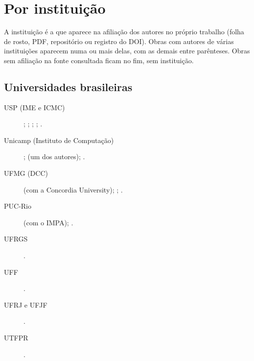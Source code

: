 \section{Por instituição}
A instituição é a que aparece na afiliação dos autores no próprio trabalho
(folha de rosto, PDF, repositório ou registro do DOI). Obras com autores de
várias instituições aparecem numa ou mais delas, com as demais entre
parênteses. Obras sem afiliação na fonte
consultada ficam no fim, sem instituição.

\begingroup\sloppy
\subsection{Universidades brasileiras}
\begin{description}
\item[USP (IME e ICMC)] ;
  ;
  ;
   \pt;
   \pt.
\item[Unicamp (Instituto de Computação)] ;
   \pt (um dos autores);
   \pt.
\item[UFMG (DCC)]  (com a Concordia
  University);
  ;
  .
\item[PUC-Rio]  (com o IMPA);
   \pt.
\item[UFRGS]  \pt.
\item[UFF] .
\item[UFRJ e UFJF]  \pt.
\item[UTFPR] .
\end{description}

